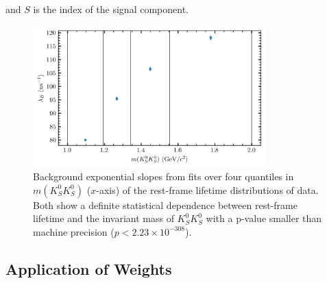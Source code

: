 and $S$ is the index of the signal component.


\begin{figure}
  \begin{center}
    \includegraphics[width=0.8\textwidth]{figures/factorization_plot_data_chisqdof_3.4_4_quantiles.png}
  \end{center}
  \caption{Background exponential slopes from fits over four quantiles in $m(K_S^0K_S^0)$ ($x$-axis) of the rest-frame lifetime distributions of data. Both show a definite statistical dependence between rest-frame lifetime and the invariant mass of $K_S^0K_S^0$ with a p-value smaller than machine precision ($p < 2.23 \times 10^{-308}$).}\label{fig:factorization}
\end{figure}

\subsection{Application of Weights}\label{sec:application-of-weights}

